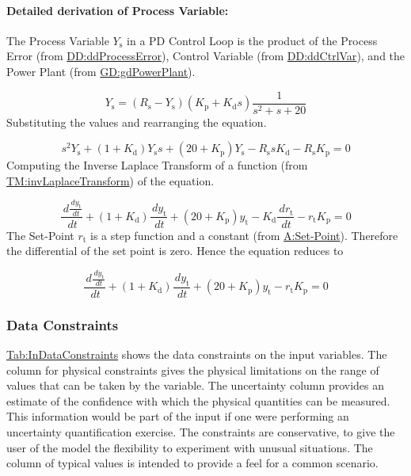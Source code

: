 \documentclass[12pt]{article}
\begin{document}
\paragraph{Detailed derivation of Process Variable:}
\label{IM:pdEquationIMDeriv}
The Process Variable ${Y_{\text{s}}}$ in a PD Control Loop is the product of the Process Error (from \hyperref[DD:ddProcessError]{DD:ddProcessError}), Control Variable (from \hyperref[DD:ddCtrlVar]{DD:ddCtrlVar}), and the Power Plant (from \hyperref[GD:gdPowerPlant]{GD:gdPowerPlant}).

\begin{displaymath}
{Y_{\text{s}}}=\left({R_{\text{s}}}-{Y_{\text{s}}}\right) \left({K_{\text{p}}}+{K_{\text{d}}} s\right) \frac{1}{s^{2}+s+20}
\end{displaymath}
Substituting the values and rearranging the equation.

\begin{displaymath}
s^{2} {Y_{\text{s}}}+\left(1+{K_{\text{d}}}\right) {Y_{\text{s}}} s+\left(20+{K_{\text{p}}}\right) {Y_{\text{s}}}-{R_{\text{s}}} s {K_{\text{d}}}-{R_{\text{s}}} {K_{\text{p}}}=0
\end{displaymath}
Computing the Inverse Laplace Transform of a function (from \hyperref[TM:invLaplaceTransform]{TM:invLaplaceTransform}) of the equation.

\begin{displaymath}
\frac{\,d\frac{\,d{y_{\text{t}}}}{\,dt}}{\,dt}+\left(1+{K_{\text{d}}}\right) \frac{\,d{y_{\text{t}}}}{\,dt}+\left(20+{K_{\text{p}}}\right) {y_{\text{t}}}-{K_{\text{d}}} \frac{\,d{r_{\text{t}}}}{\,dt}-{r_{\text{t}}} {K_{\text{p}}}=0
\end{displaymath}
The Set-Point ${r_{\text{t}}}$ is a step function and a constant (from \hyperref[setPoint]{A:Set-Point}). Therefore the differential of the set point is zero. Hence the equation reduces to

\begin{displaymath}
\frac{\,d\frac{\,d{y_{\text{t}}}}{\,dt}}{\,dt}+\left(1+{K_{\text{d}}}\right) \frac{\,d{y_{\text{t}}}}{\,dt}+\left(20+{K_{\text{p}}}\right) {y_{\text{t}}}-{r_{\text{t}}} {K_{\text{p}}}=0
\end{displaymath}
\subsubsection{Data Constraints}
\label{Sec:DataConstraints}
\hyperref[Table:InDataConstraints]{Tab:InDataConstraints} shows the data constraints on the input variables. The column for physical constraints gives the physical limitations on the range of values that can be taken by the variable. The uncertainty column provides an estimate of the confidence with which the physical quantities can be measured. This information would be part of the input if one were performing an uncertainty quantification exercise. The constraints are conservative, to give the user of the model the flexibility to experiment with unusual situations. The column of typical values is intended to provide a feel for a common scenario.
\end{document}
